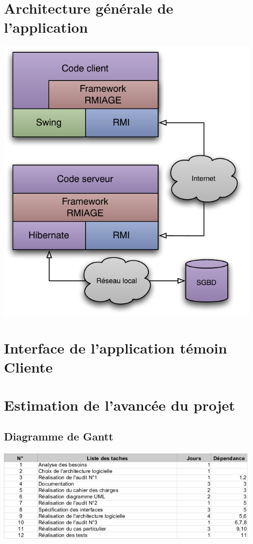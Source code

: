 \appendix

\section{Architecture générale de l'application}
\label{archi_generale}

\includegraphics{../diagrammes/architecture.pdf}

\section{Interface de l'application témoin Cliente}
\label{screen_client}

\section{Estimation de l'avancée du projet}
\subsection{Diagramme de Gantt}
\label{gantt}

\begin{center}
\includegraphics[scale=0.7]{../diagrammes/gantt.png}
\end{center}

